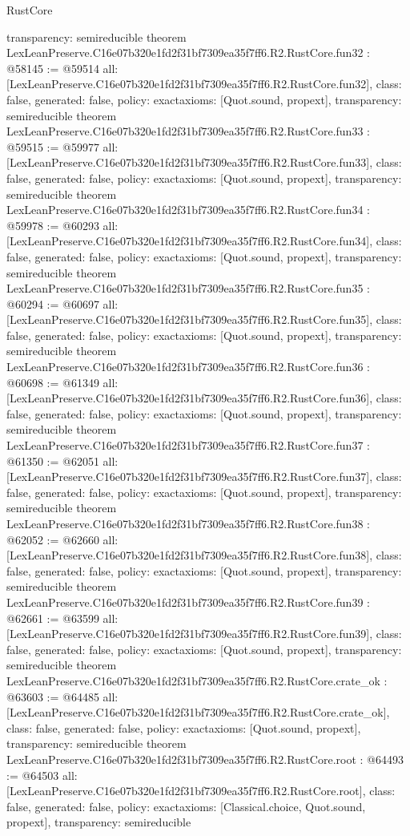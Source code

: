 \begin{lexlean}{RustCore}
\begin{coremodule}
{  transparency: semireducible
}
theorem LexLeanPreserve.C16e07b320e1fd2f31bf7309ea35f7ff6.R2.RustCore.fun32 : @58145 := @59514 {
  all: [LexLeanPreserve.C16e07b320e1fd2f31bf7309ea35f7ff6.R2.RustCore.fun32],
  class: false,
  generated: false,
  policy: exact{axioms: [Quot.sound, propext]},
  transparency: semireducible
}
theorem LexLeanPreserve.C16e07b320e1fd2f31bf7309ea35f7ff6.R2.RustCore.fun33 : @59515 := @59977 {
  all: [LexLeanPreserve.C16e07b320e1fd2f31bf7309ea35f7ff6.R2.RustCore.fun33],
  class: false,
  generated: false,
  policy: exact{axioms: [Quot.sound, propext]},
  transparency: semireducible
}
theorem LexLeanPreserve.C16e07b320e1fd2f31bf7309ea35f7ff6.R2.RustCore.fun34 : @59978 := @60293 {
  all: [LexLeanPreserve.C16e07b320e1fd2f31bf7309ea35f7ff6.R2.RustCore.fun34],
  class: false,
  generated: false,
  policy: exact{axioms: [Quot.sound, propext]},
  transparency: semireducible
}
theorem LexLeanPreserve.C16e07b320e1fd2f31bf7309ea35f7ff6.R2.RustCore.fun35 : @60294 := @60697 {
  all: [LexLeanPreserve.C16e07b320e1fd2f31bf7309ea35f7ff6.R2.RustCore.fun35],
  class: false,
  generated: false,
  policy: exact{axioms: [Quot.sound, propext]},
  transparency: semireducible
}
theorem LexLeanPreserve.C16e07b320e1fd2f31bf7309ea35f7ff6.R2.RustCore.fun36 : @60698 := @61349 {
  all: [LexLeanPreserve.C16e07b320e1fd2f31bf7309ea35f7ff6.R2.RustCore.fun36],
  class: false,
  generated: false,
  policy: exact{axioms: [Quot.sound, propext]},
  transparency: semireducible
}
theorem LexLeanPreserve.C16e07b320e1fd2f31bf7309ea35f7ff6.R2.RustCore.fun37 : @61350 := @62051 {
  all: [LexLeanPreserve.C16e07b320e1fd2f31bf7309ea35f7ff6.R2.RustCore.fun37],
  class: false,
  generated: false,
  policy: exact{axioms: [Quot.sound, propext]},
  transparency: semireducible
}
theorem LexLeanPreserve.C16e07b320e1fd2f31bf7309ea35f7ff6.R2.RustCore.fun38 : @62052 := @62660 {
  all: [LexLeanPreserve.C16e07b320e1fd2f31bf7309ea35f7ff6.R2.RustCore.fun38],
  class: false,
  generated: false,
  policy: exact{axioms: [Quot.sound, propext]},
  transparency: semireducible
}
theorem LexLeanPreserve.C16e07b320e1fd2f31bf7309ea35f7ff6.R2.RustCore.fun39 : @62661 := @63599 {
  all: [LexLeanPreserve.C16e07b320e1fd2f31bf7309ea35f7ff6.R2.RustCore.fun39],
  class: false,
  generated: false,
  policy: exact{axioms: [Quot.sound, propext]},
  transparency: semireducible
}
theorem LexLeanPreserve.C16e07b320e1fd2f31bf7309ea35f7ff6.R2.RustCore.crate_ok : @63603 := @64485 {
  all: [LexLeanPreserve.C16e07b320e1fd2f31bf7309ea35f7ff6.R2.RustCore.crate_ok],
  class: false,
  generated: false,
  policy: exact{axioms: [Quot.sound, propext]},
  transparency: semireducible
}
theorem LexLeanPreserve.C16e07b320e1fd2f31bf7309ea35f7ff6.R2.RustCore.root : @64493 := @64503 {
  all: [LexLeanPreserve.C16e07b320e1fd2f31bf7309ea35f7ff6.R2.RustCore.root],
  class: false,
  generated: false,
  policy: exact{axioms: [Classical.choice, Quot.sound, propext]},
  transparency: semireducible
}


\end{coremodule}
\end{lexlean}
